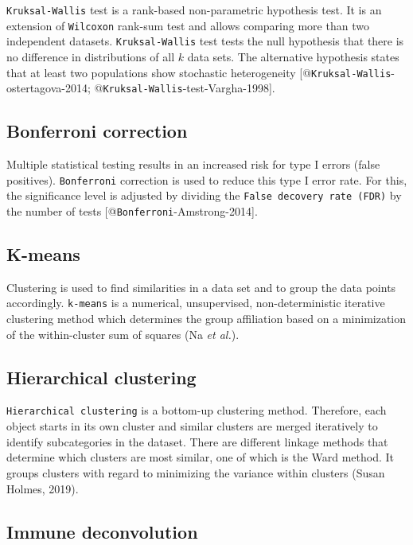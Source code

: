 \documentclass[
  parskip,
  oneside]{scrreprt}
\begin{document}
\texttt{Kruksal-Wallis} test is a rank-based non-parametric hypothesis
test. It is an extension of \texttt{Wilcoxon} rank-sum test and allows
comparing more than two independent datasets. \texttt{Kruksal-Wallis}
test tests the null hypothesis that there is no difference in
distributions of all \(k\) data sets. The alternative hypothesis states
that at least two populations show stochastic heterogeneity
{[}@\texttt{Kruksal-Wallis}-ostertagova-2014;
@\texttt{Kruksal-Wallis}-test-Vargha-1998{]}.

\hypertarget{bonferroni-correction}{%
\subsection{Bonferroni correction}\label{bonferroni-correction}}

Multiple statistical testing results in an increased risk for type I
errors (false positives). \texttt{Bonferroni} correction is used to
reduce this type I error rate. For this, the significance level is
adjusted by dividing the \texttt{False\ decovery\ rate\ (FDR)} by the
number of tests {[}@\texttt{Bonferroni}-Amstrong-2014{]}.

\hypertarget{k-means}{%
\subsection{K-means}\label{k-means}}

Clustering is used to find similarities in a data set and to group the
data points accordingly. \texttt{k-means} is a numerical, unsupervised,
non-deterministic iterative clustering method which determines the group
affiliation based on a minimization of the within-cluster sum of squares
(Na \emph{et al.}).

\hypertarget{hierarchical-clustering}{%
\subsection{Hierarchical clustering}\label{hierarchical-clustering}}

\texttt{Hierarchical\ clustering} is a bottom-up clustering method.
Therefore, each object starts in its own cluster and similar clusters
are merged iteratively to identify subcategories in the dataset. There
are different linkage methods that determine which clusters are most
similar, one of which is the Ward method. It groups clusters with regard
to minimizing the variance within clusters (Susan Holmes, 2019).

\hypertarget{immune-deconvolution}{%
\subsection{Immune deconvolution}\label{immune-deconvolution}}
\end{document}
